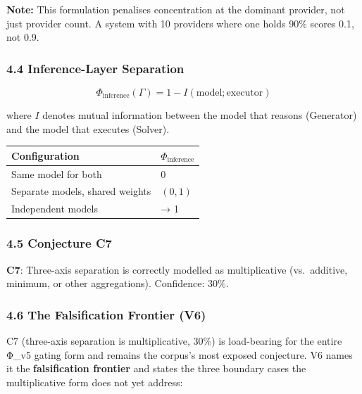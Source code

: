\documentclass[
]{article}
\newcounter{none} %
\begin{document}
\textbf{Note:} This formulation penalises concentration at the dominant
provider, not just provider count. A system with 10 providers where one
holds 90\% scores 0.1, not 0.9.

\subsubsection{4.4 Inference-Layer
Separation}\label{inference-layer-separation}

\[\Phi_{\text{inference}}(\Gamma) = 1 - I(\text{model} ; \text{executor})\]

where \(I\) denotes mutual information between the model that reasons
(Generator) and the model that executes (Solver).

{\def\LTcaptype{none} %
\begin{longtable}[]{@{}ll@{}}
\toprule\noalign{}
Configuration & \(\Phi_{\text{inference}}\) \\
\midrule\noalign{}
\endhead
\bottomrule\noalign{}
\endlastfoot
Same model for both & 0 \\
Separate models, shared weights & \((0, 1)\) \\
Independent models & → 1 \\
\end{longtable}
}

\subsubsection{4.5 Conjecture C7}\label{conjecture-c7}

\textbf{C7}: Three-axis separation is correctly modelled as
multiplicative (vs.~additive, minimum, or other aggregations).
Confidence: 30\%.

\subsubsection{4.6 The Falsification Frontier
(V6)}\label{the-falsification-frontier-v6}

C7 (three-axis separation is multiplicative, 30\%) is load-bearing for
the entire Φ\_v5 gating form and remains the corpus's most exposed
conjecture. V6 names it the \textbf{falsification frontier} and states
the three boundary cases the multiplicative form does not yet address:
\end{document}
